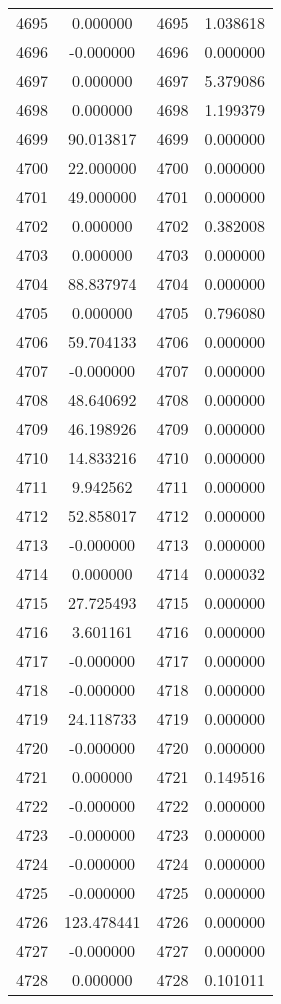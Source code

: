 \documentclass[12pt]{article}
\begin{document}
\begin{longtable}{@{}cccc@{}}
4695 & 0.000000 & 4695 & 1.038618 \\
4696 & -0.000000 & 4696 & 0.000000 \\
4697 & 0.000000 & 4697 & 5.379086 \\
4698 & 0.000000 & 4698 & 1.199379 \\
4699 & 90.013817 & 4699 & 0.000000 \\
4700 & 22.000000 & 4700 & 0.000000 \\
4701 & 49.000000 & 4701 & 0.000000 \\
4702 & 0.000000 & 4702 & 0.382008 \\
4703 & 0.000000 & 4703 & 0.000000 \\
4704 & 88.837974 & 4704 & 0.000000 \\
4705 & 0.000000 & 4705 & 0.796080 \\
4706 & 59.704133 & 4706 & 0.000000 \\
4707 & -0.000000 & 4707 & 0.000000 \\
4708 & 48.640692 & 4708 & 0.000000 \\
4709 & 46.198926 & 4709 & 0.000000 \\
4710 & 14.833216 & 4710 & 0.000000 \\
4711 & 9.942562 & 4711 & 0.000000 \\
4712 & 52.858017 & 4712 & 0.000000 \\
4713 & -0.000000 & 4713 & 0.000000 \\
4714 & 0.000000 & 4714 & 0.000032 \\
4715 & 27.725493 & 4715 & 0.000000 \\
4716 & 3.601161 & 4716 & 0.000000 \\
4717 & -0.000000 & 4717 & 0.000000 \\
4718 & -0.000000 & 4718 & 0.000000 \\
4719 & 24.118733 & 4719 & 0.000000 \\
4720 & -0.000000 & 4720 & 0.000000 \\
4721 & 0.000000 & 4721 & 0.149516 \\
4722 & -0.000000 & 4722 & 0.000000 \\
4723 & -0.000000 & 4723 & 0.000000 \\
4724 & -0.000000 & 4724 & 0.000000 \\
4725 & -0.000000 & 4725 & 0.000000 \\
4726 & 123.478441 & 4726 & 0.000000 \\
4727 & -0.000000 & 4727 & 0.000000 \\
4728 & 0.000000 & 4728 & 0.101011 \\

\end{longtable}
\end{document}
